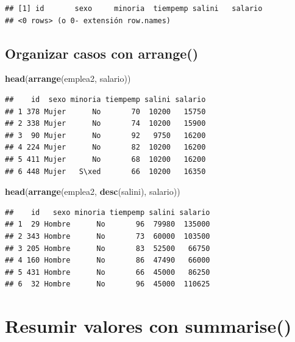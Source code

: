 \documentclass[
]{book}
\newenvironment{Shaded}{\begin{snugshade}}{\end{snugshade}}
\newcommand{\FunctionTok}[1]{\textcolor[rgb]{0.13,0.29,0.53}{\textbf{#1}}}
\newcommand{\NormalTok}[1]{#1}
\begin{document}
\begin{verbatim}
## [1] id       sexo     minoria  tiempemp salini   salario 
## <0 rows> (o 0- extensión row.names)
\end{verbatim}

\subsection{\texorpdfstring{Organizar casos con \textbf{arrange()}}{Organizar casos con arrange()}}\label{organizar-casos-con-arrange}

\begin{Shaded}
\begin{Highlighting}[]
\FunctionTok{head}\NormalTok{(}\FunctionTok{arrange}\NormalTok{(emplea2, salario))}
\end{Highlighting}
\end{Shaded}

\begin{verbatim}
##    id  sexo minoria tiempemp salini salario
## 1 378 Mujer      No       70  10200   15750
## 2 338 Mujer      No       74  10200   15900
## 3  90 Mujer      No       92   9750   16200
## 4 224 Mujer      No       82  10200   16200
## 5 411 Mujer      No       68  10200   16200
## 6 448 Mujer   S\xed       66  10200   16350
\end{verbatim}

\begin{Shaded}
\begin{Highlighting}[]
\FunctionTok{head}\NormalTok{(}\FunctionTok{arrange}\NormalTok{(emplea2, }\FunctionTok{desc}\NormalTok{(salini), salario))}
\end{Highlighting}
\end{Shaded}

\begin{verbatim}
##    id   sexo minoria tiempemp salini salario
## 1  29 Hombre      No       96  79980  135000
## 2 343 Hombre      No       73  60000  103500
## 3 205 Hombre      No       83  52500   66750
## 4 160 Hombre      No       86  47490   66000
## 5 431 Hombre      No       66  45000   86250
## 6  32 Hombre      No       96  45000  110625
\end{verbatim}

\section{\texorpdfstring{Resumir valores con \textbf{summarise()}}{Resumir valores con summarise()}}\label{resumir-valores-con-summarise}
\end{document}
